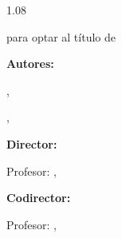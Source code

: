 \begin{titlepage}
  \centering
  \begin{spacing}{1.08}
    \vspace*{0.8cm}

    {\fontsize{16}{21}\selectfont\bfseries
      \MakeUppercase{\TituloTrabajo}\par}

    \vspace{1.0cm}

    {\large
      \TipoDocumento\par
      para optar al título de\par
      \textit{\TituloObtenido}\par}

    \vspace{0.75cm}

    {\large
      \textbf{Autores:}\par
      \AutorUno, \CodigoAutorUno\par
      \AutorDos, \CodigoAutorDos\par}

    \vspace{0.65cm}

    {\large
      \textbf{Director:}\par
      Profesor: \DirectorNombre, \DirectorTitulo\par
      \DirectorFormacion\par}

    \vspace{0.55cm}

    {\large
      \textbf{Codirector:}\par
      Profesor: \CodirectorNombre, \CodirectorTitulo\par
      \CodirectorFormacion\par}

    \vspace{0.8cm}

    \LogoUIS[4.35cm]

    \vfill

    {\large\MakeUppercase{\BloqueInstitucional}}
  \end{spacing}
\end{titlepage}

